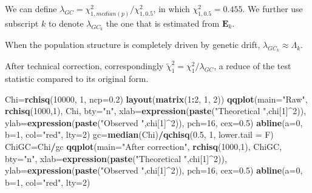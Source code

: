 \documentclass[]{book}
\newenvironment{Shaded}{\begin{snugshade}}{\end{snugshade}}
\newcommand{\DataTypeTok}[1]{\textcolor[rgb]{0.13,0.29,0.53}{#1}}
\newcommand{\DecValTok}[1]{\textcolor[rgb]{0.00,0.00,0.81}{#1}}
\newcommand{\FloatTok}[1]{\textcolor[rgb]{0.00,0.00,0.81}{#1}}
\newcommand{\KeywordTok}[1]{\textcolor[rgb]{0.13,0.29,0.53}{\textbf{#1}}}
\newcommand{\NormalTok}[1]{#1}
\newcommand{\OperatorTok}[1]{\textcolor[rgb]{0.81,0.36,0.00}{\textbf{#1}}}
\newcommand{\StringTok}[1]{\textcolor[rgb]{0.31,0.60,0.02}{#1}}
\begin{document}
We can define \(\lambda_{GC}=\chi^2_{1,median(p)}/\chi^2_{1,0.5}\), in
which \(\chi^2_{1,0.5}=0.455\). We further use subscript \(k\) to denote
\(\lambda_{GC_k}\) the one that is estimated from \(\mathbf{E}_k\).

When the population structure is completely driven by genetic drift,
\(\lambda_{GC_k} \approx \Lambda_k\).

After technical correction, correspondingly
\(\tilde\chi^2_1=\chi^2_1/\lambda_{GC}\), a reduce of the test statistic
compared to its original form.

\begin{Shaded}
\begin{Highlighting}[]
\NormalTok{Chi=}\KeywordTok{rchisq}\NormalTok{(}\DecValTok{10000}\NormalTok{, }\DecValTok{1}\NormalTok{, }\DataTypeTok{ncp=}\FloatTok{0.2}\NormalTok{)}
\KeywordTok{layout}\NormalTok{(}\KeywordTok{matrix}\NormalTok{(}\DecValTok{1}\OperatorTok{:}\DecValTok{2}\NormalTok{, }\DecValTok{1}\NormalTok{, }\DecValTok{2}\NormalTok{))}
\KeywordTok{qqplot}\NormalTok{(}\DataTypeTok{main=}\StringTok{"Raw"}\NormalTok{, }\KeywordTok{rchisq}\NormalTok{(}\DecValTok{1000}\NormalTok{,}\DecValTok{1}\NormalTok{), Chi, }\DataTypeTok{bty=}\StringTok{"n"}\NormalTok{, }\DataTypeTok{xlab=}\KeywordTok{expression}\NormalTok{(}\KeywordTok{paste}\NormalTok{(}\StringTok{"Theoretical "}\NormalTok{,chi[}\DecValTok{1}\NormalTok{]}\OperatorTok{^}\DecValTok{2}\NormalTok{)), }\DataTypeTok{ylab=}\KeywordTok{expression}\NormalTok{(}\KeywordTok{paste}\NormalTok{(}\StringTok{"Observed "}\NormalTok{,chi[}\DecValTok{1}\NormalTok{]}\OperatorTok{^}\DecValTok{2}\NormalTok{)), }\DataTypeTok{pch=}\DecValTok{16}\NormalTok{, }\DataTypeTok{cex=}\FloatTok{0.5}\NormalTok{)}
\KeywordTok{abline}\NormalTok{(}\DataTypeTok{a=}\DecValTok{0}\NormalTok{, }\DataTypeTok{b=}\DecValTok{1}\NormalTok{, }\DataTypeTok{col=}\StringTok{"red"}\NormalTok{, }\DataTypeTok{lty=}\DecValTok{2}\NormalTok{)}
\NormalTok{gc=}\KeywordTok{median}\NormalTok{(Chi)}\OperatorTok{/}\KeywordTok{qchisq}\NormalTok{(}\FloatTok{0.5}\NormalTok{, }\DecValTok{1}\NormalTok{, }\DataTypeTok{lower.tail =}\NormalTok{ F)}
\NormalTok{ChiGC=Chi}\OperatorTok{/}\NormalTok{gc}
\KeywordTok{qqplot}\NormalTok{(}\DataTypeTok{main=}\StringTok{"After correction"}\NormalTok{, }\KeywordTok{rchisq}\NormalTok{(}\DecValTok{1000}\NormalTok{,}\DecValTok{1}\NormalTok{), ChiGC, }\DataTypeTok{bty=}\StringTok{"n"}\NormalTok{, }\DataTypeTok{xlab=}\KeywordTok{expression}\NormalTok{(}\KeywordTok{paste}\NormalTok{(}\StringTok{"Theoretical "}\NormalTok{,chi[}\DecValTok{1}\NormalTok{]}\OperatorTok{^}\DecValTok{2}\NormalTok{)), }\DataTypeTok{ylab=}\KeywordTok{expression}\NormalTok{(}\KeywordTok{paste}\NormalTok{(}\StringTok{"Observed "}\NormalTok{,chi[}\DecValTok{1}\NormalTok{]}\OperatorTok{^}\DecValTok{2}\NormalTok{)), }\DataTypeTok{pch=}\DecValTok{16}\NormalTok{, }\DataTypeTok{cex=}\FloatTok{0.5}\NormalTok{)}
\KeywordTok{abline}\NormalTok{(}\DataTypeTok{a=}\DecValTok{0}\NormalTok{, }\DataTypeTok{b=}\DecValTok{1}\NormalTok{, }\DataTypeTok{col=}\StringTok{"red"}\NormalTok{, }\DataTypeTok{lty=}\DecValTok{2}\NormalTok{)}
\end{Highlighting}
\end{Shaded}
\end{document}
